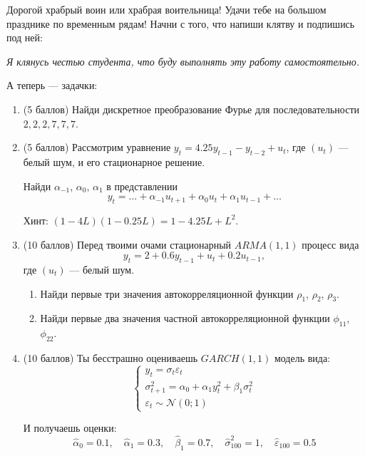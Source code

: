 \documentclass[12pt]{article}
\def \cN{\mathcal{N}}
\begin{document}
Дорогой храбрый воин или храбрая воительница! Удачи тебе на большом празднике по временным рядам!
Начни с того, что напиши клятву и подпишись под ней:

\vspace{10pt}
\textit{Я клянусь честью студента, что буду выполнять эту работу самостоятельно.}
\vspace{10pt}


А теперь — задачки:



\begin{enumerate}

    \item (5 баллов) Найди дискретное преобразование Фурье для последовательности $2, 2, 2, 7, 7, 7$. 
    
    \item (5 баллов) Рассмотрим уравнение $y_t = 4.25y_{t-1} - y_{t-2} + u_t$, где $(u_t)$ — белый шум, и его стационарное решение.
    

    Найди $\alpha_{-1}$, $\alpha_0$, $\alpha_1$ в представлении
    \[
        y_t = \ldots + \alpha_{-1}u_{t+1} + \alpha_0 u_t + \alpha_1 u_{t-1} + \ldots
    \]

    Хинт: $(1-4L)(1-0.25L) = 1 -4.25L + L^2$.

    
    \item (10 баллов) Перед твоими очами стационарный $ARMA(1,1)$ процесс вида
    \[
    y_t = 2 + 0.6 y_{t-1} + u_t + 0.2 u_{t-1},
    \]
    где $(u_t)$ — белый шум. 

    \begin{enumerate}
        \item Найди первые три значения автокорреляционной функции $\rho_1$, $\rho_2$, $\rho_3$.
        \item Найди первые два значения частной автокорреляционной функции $\phi_{11}$, $\phi_{22}$.
    \end{enumerate}


	\item (10 баллов) Ты бесстрашно оцениваешь $GARCH(1, 1)$ модель вида:
	\[ 
        \begin{cases}
            y_t = \sigma_t \varepsilon_t \\
            \sigma_{t+1}^{2}=\alpha_{0}+\alpha_{1} y_{t}^{2}+\beta_{1} \sigma_{t}^{2}    \\
            \varepsilon_t \sim \cN(0;1)
        \end{cases}     
    \]
	
	И получаешь оценки:
    \[ 
        \hat{\alpha}_0 = 0.1, 
    \quad \hat{\alpha}_1 = 0.3, \quad \hat{\beta}_1 = 0.7, \quad \hat{\sigma}^2_{100} = 1, \quad \hat\varepsilon_{100} = 0.5 
    \]
    

\end{enumerate}
\end{document}
